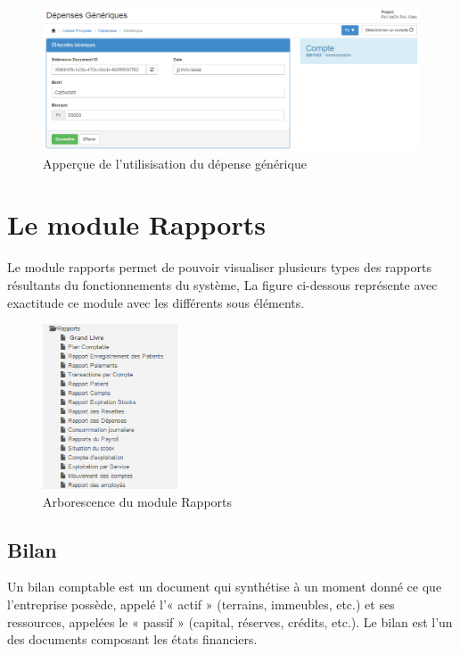 \documentclass[12pt,a4paper]{report}
\begin{document}
\begin{figure}[h]
\begin{center}
\includegraphics[width=14cm]{pic/FormDepGen.png}
\end{center}
\caption{Apperçue de l'utilisisation du dépense générique}
\label{Apperçue de l'utilisisation du dépense générique}
\end{figure}


\newpage
\chapter{Le module Rapports}        
Le module rapports permet de pouvoir visualiser plusieurs types des rapports résultants du fonctionnements du système, La figure ci-dessous représente avec exactitude ce module avec les différents sous éléments.

\begin{figure}[h]
\begin{center}
\includegraphics[width=4cm]{pic/ArboReport.png}
\end{center}
\caption{Arborescence du module Rapports}
\label{Arborescence du module Rapports}
\end{figure}

\newpage
\section{Bilan}
Un bilan  comptable est un document qui synthétise à un moment donné ce que l'entreprise possède, appelé l'« actif » (terrains, immeubles, etc.) et ses ressources, appelées le « passif » (capital, réserves, crédits, etc.). Le bilan est l'un des documents composant les états financiers.
\end{document}
